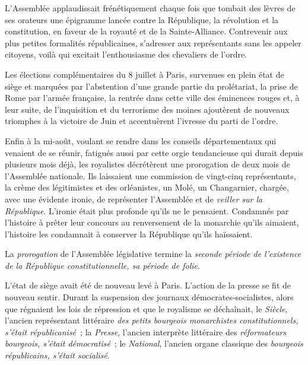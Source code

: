 \documentclass[french,twoside]{book} %
\begin{document}
L’Assemblée applaudissait frénétiquement chaque fois que tombait des lèvres de ses orateurs une épigramme lancée contre la République, la révolution et la constitution, en faveur de la royauté et de la Sainte-Alliance. Contrevenir aux plus petites formalités républicaines, s’adresser aux représentants sans les appeler citoyens, voilà qui excitait l’enthousiasme des chevaliers de l’ordre.\par
Les élections complémentaires du 8 juillet à Paris, survenues en plein état de siège et marquées par l’abstention d’une grande partie du prolétariat, la prise de Rome par l’armée française, la rentrée dans cette ville des éminences rouges et, à leur suite, de l’inquisition et du terrorisme des moines ajoutèrent de nouveaux triomphes à la victoire de Juin et accentuèrent l’ivresse du parti de l’ordre.\par
Enfin à la mi-août, voulant se rendre dans les conseils départementaux qui venaient de se réunir, fatigués aussi par cette orgie tendancieuse qui durait depuis plusieurs mois déjà, les royalistes décrétèrent une prorogation de deux mois de l’Assemblée nationale. Ils laissaient une commission de vingt-cinq représentants, la crème des légitimistes et des orléanistes, un Molé, un Changarnier, chargée, avec une évidente ironie, de représenter l’Assemblée et de \emph{veiller sur la République}. L’ironie était plus profonde qu’ils ne le pensaient. Condamnés par l’histoire à prêter leur concours au renversement de la monarchie qu’ils aimaient, l’histoire les condamnait à conserver la République qu’ils haïssaient.\par
La \emph{prorogation} de l’Assemblée législative termine la \emph{seconde période de l’existence de la République constitutionnelle, sa période de folie}.\par
L’état de siège avait été de nouveau levé à Paris. L’action de la presse se fit de nouveau sentir. Durant la suspension des journaux démocrates-socialistes, alors que régnaient les lois de répression et que le royalisme se déchaînait, le \emph{Siècle}, l’ancien représentant littéraire \emph{des petits bourgeois monarchistes constitutionnels, s’était républicanisé} ; la \emph{Presse}, l’ancien interprète littéraire des \emph{réformateurs bourgeois, s’était démocratisé} ; le \emph{National}, l’ancien organe classique des \emph{bourgeois républicains, s’était socialisé}.\par
\end{document}

